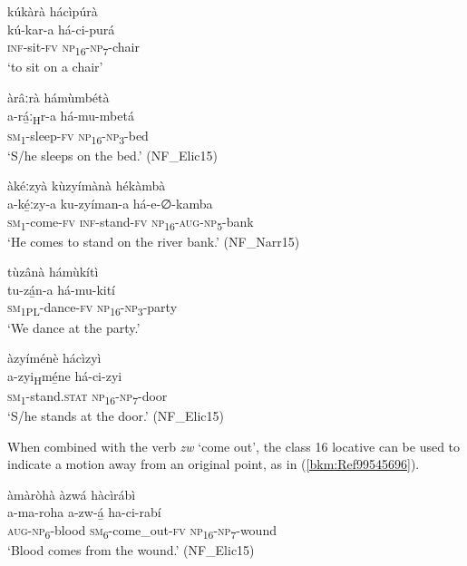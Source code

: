 \ea
\label{bkm:Ref71013022}
kúkàrà hácìpúrà\\
\gll kú-kar-a  há-ci-purá\\
\textsc{inf}-sit-\textsc{fv}  \textsc{np}\textsubscript{16}-\textsc{np}\textsubscript{7}-chair\\
\glt ‘to sit on a chair’
\z

\ea
àrâːrà hámùmbétà\\
\gll a-rá̲ː\textsubscript{H}r-a  há-mu-mbetá\\
\textsc{sm}\textsubscript{1}-sleep-\textsc{fv}  \textsc{np}\textsubscript{16}-\textsc{np}\textsubscript{3}-bed\\
\glt ‘S/he sleeps on the bed.’ (NF\_Elic15)
\z

\ea
\label{bkm:Ref71013023}
àkéːzyà kùzyímànà hékàmbà\\
\gll a-ké̲ːzy-a    ku-zyíman-a    há-e-∅-kamba\\
\textsc{sm}\textsubscript{1}-come-\textsc{fv}  \textsc{inf}-stand-\textsc{fv}    \textsc{np}\textsubscript{16}-\textsc{aug}-\textsc{np}\textsubscript{5}-bank\\
\glt ‘He comes to stand on the river bank.’ (NF\_Narr15)
\z

\ea
\label{bkm:Ref450663404}
tùzânà hámùkítì\\
\gll tu-zá̲n-a    há-mu-kití\\
\textsc{sm}\textsubscript{1PL}-dance-\textsc{fv}  \textsc{np}\textsubscript{16}-\textsc{np}\textsubscript{3}-party\\
\glt ‘We dance at the party.’
\z

\ea
\label{bkm:Ref450663405}
àzyíménè hácìzyì\\
\gll a-zyi\textsubscript{H}mé̲ne    há-ci-zyi\\
\textsc{sm}\textsubscript{1}-stand.\textsc{stat}  \textsc{np}\textsubscript{16}-\textsc{np}\textsubscript{7}-door\\
\glt ‘S/he stands at the door.’ (NF\_Elic15)
\z

When combined with the verb \textit{zw} ‘come out’, the class 16 locative can be used to indicate a motion away from an original point, as in (\ref{bkm:Ref99545696}).

\ea
\label{bkm:Ref99545696}
àmàròhà àzwá hàcìrábì\\
\gll a-ma-roha    a-zw-á̲    ha-ci-rabí\\
\textsc{aug}-\textsc{np}\textsubscript{6}-blood  \textsc{sm}\textsubscript{6}-come\_out-\textsc{fv}  \textsc{np}\textsubscript{16}-\textsc{np}\textsubscript{7}-wound\\
\glt ‘Blood comes from the wound.’ (NF\_Elic15)
\z


